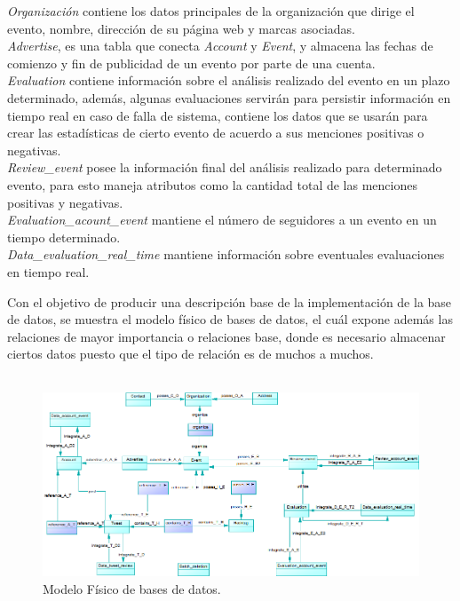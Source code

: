 \documentclass{memoria}
\begin{document}
\textit{Organización} contiene los datos principales de la organización que dirige el evento, nombre, dirección de su página web y marcas asociadas.\\
\textit{Advertise}, es una tabla que conecta \textit{Account} y \textit{Event}, y almacena las fechas de comienzo y fin de publicidad de un evento por parte de una cuenta.\\
\textit{Evaluation} contiene información sobre el análisis realizado del evento en un plazo determinado, además, algunas evaluaciones servirán para persistir información en tiempo real en caso de falla de sistema, contiene los datos que se usarán para crear las estadísticas de cierto evento de acuerdo a sus menciones positivas o negativas.\\
\textit{Review\_event} posee la información final del análisis realizado para determinado evento, para esto maneja atributos como la cantidad total de las menciones positivas y negativas.\\
\textit{Evaluation\_acount\_event} mantiene el número de seguidores a un evento en un tiempo determinado.\\
\textit{Data\_evaluation\_real\_time}  mantiene información sobre eventuales evaluaciones en tiempo real.

\newpage
{}
Con el objetivo de producir una descripción base de la implementación de la base de datos, se muestra el modelo físico de bases de datos, el cuál expone además las relaciones de mayor importancia o relaciones base, donde es necesario almacenar ciertos datos puesto que el tipo de relación es de muchos a muchos.\\
\\
\begin{figure}[!ht]
\begin{center}
\includegraphics[width=1\textwidth]{img/fisico.png}
\caption{Modelo Físico de bases de datos.}
\end{center}
\end{figure}
\newpage
\end{document}
